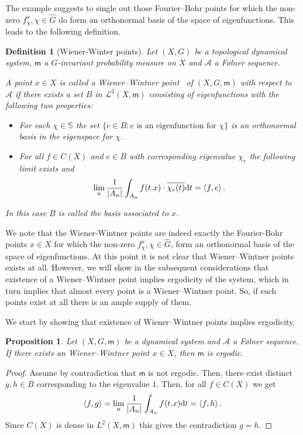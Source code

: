 \documentclass [14pt]{amsart}
\numberwithin{equation}{section}
\newcommand{\cA}{{\mathcal A}}
\newcommand{\mm}{\mathsf{m}}
\newcommand{\dd}{\mbox{\rm d}}
\newcommand{\SSS}{\mathbb S}
\newtheorem{prop}[theorem]{Proposition}
\newtheorem{definition}[theorem]{Definition}
\begin{document}
The example suggests to single out those Fourier--Bohr points for which the non-zero $f_\chi^x , \chi \in \widehat{G}$  do form an orthonormal basis of the space of eigenfunctions. This leads to the following definition.

\begin{definition}[Wiener-Winter points] Let $(X,G)$ be a topological dynamical system, $\mm$ a $G$-invariant probability measure on $X$ and $\mathcal{A}$ a F\o lner sequence.

A point $x\in X$ is called a {\rm Wiener--Wintner point \ of $(X,G,\mm)$ with respect to $\mathcal{A}$} if
 there exists a set $B$ in $\mathcal{L}^2 (X, \mm)$ consisting of eigenfunctions with the following two properties:
 \begin{itemize}
   \item{}  For each $\chi \in \SSS$ the set $\{ e \in B : e \mbox{ is an eigenfunction for } \chi \}$ is an orthonormal basis in the eigenspace for $\chi$.
   \item{} For all $f \in C(X)$  and $e\in B$ with corresponding eigenvalue $\chi_e$ the following limit exists and
   \[
   \lim_n \frac{1}{|A_n|} \int_{A_n} f(t.x) \cdot \overline{\chi_e(t)} \dd t=\langle f, e\rangle \,.
   \]
 \end{itemize}
In this case  $B$ is called the {\rm basis associated to $x$}.
\end{definition}

We note that the Wiener-Wintner points are indeed exactly the Fourier-Bohr points  $x\in X$
 for which the non-zero $f_\chi^x , \chi \in \widehat{G}$, form an orthonormal basis of the space of eigenfunctions.
At this point it is not clear that Wiener--Wintner points exists at all. However, we will show in the subsequent considerations that existence of a Wiener--Wintner point implies ergodicity of the system, which in turn implies that almost every point is a Wiener--Wintner point. So, if such points exist at all there is an ample supply of them.


We start by  showing  that existence of Wiener--Wintner points implies ergodicity.

\begin{prop} Let $(X, G, \mm)$ be a dynamical system and $\cA$ a F\o lner sequence. If there exists an  Wiener--Wintner point  $x\in X$, then $\mm$ is ergodic.
\end{prop}
\begin{proof}
Assume by contradiction that $\mm$ is not ergodic. Then, there exist distinct $g,h \in B$ corresponding to the eigenvalue $1$. Then,  for all $f \in C(X)$ we get
$$
  \langle f, g \rangle = \lim_n \frac{1}{|A_n|} \int_{A_n} f(t.x) \dd t  = \langle f, h\rangle \,.$$
Since $C(X)$ is dense in $L^2 (X,\mm)$ this gives the contradiction $g = h$. 	
\end{proof}
\end{document}
